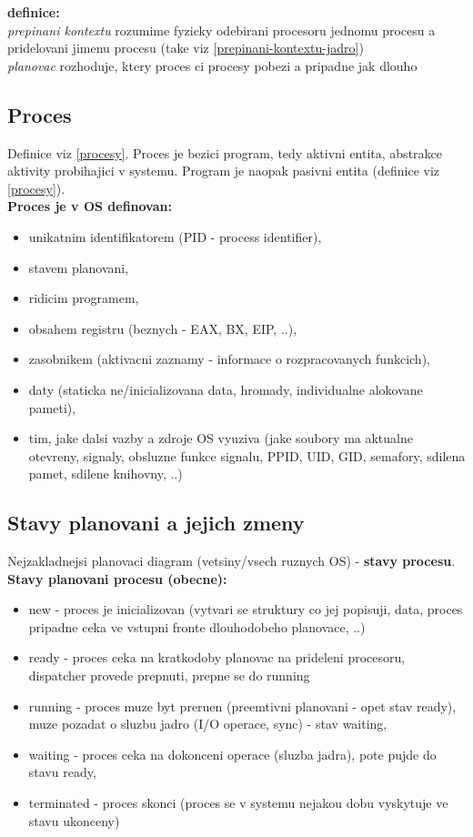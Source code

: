 \documentclass[a4paper, 11pt]{article}
\begin{document}
\textbf{definice:} \\[0.5em]
\textit{prepinani kontextu} rozumime fyzicky odebirani procesoru jednomu procesu a pridelovani jimenu procesu (take viz \ref{prepinani-kontextu-jadro}) \\[0.2em]
\textit{planovac} rozhoduje, ktery proces ci procesy pobezi a pripadne jak dlouho

\subsection{Proces}
Definice viz \ref{procesy}. Proces je bezici program, tedy aktivni entita, abstrakce aktivity probihajici v systemu. Program je naopak pasivni entita (definice viz \ref{procesy}). \\

\textbf{Proces je v OS definovan:}
\begin{itemize}
    \item unikatnim identifikatorem (PID - process identifier),
    \item stavem planovani,
    \item ridicim programem,
    \item obsahem registru (beznych - EAX, BX, EIP, ..),
    \item zasobnikem (aktivacni zaznamy - informace o rozpracovanych funkcich),
    \item daty (staticka ne/inicializovana data, hromady, individualne alokovane pameti),
    \item tim, jake dalsi vazby a zdroje OS vyuziva (jake soubory ma aktualne otevreny, signaly, obsluzne funkce signalu, PPID, UID, GID, semafory, sdilena pamet, sdilene knihovny, ..) \\
\end{itemize}

\newpage

\subsection{Stavy planovani a jejich zmeny}
Nejzakladnejsi planovaci diagram (vetsiny/vsech ruznych OS) - \textbf{stavy procesu}. \\

\textbf{Stavy planovani procesu (obecne):}
\begin{itemize}
    \item new - proces je inicializovan (vytvari se struktury co jej popisuji, data, proces pripadne ceka ve vstupni fronte dlouhodobeho planovace, ..)
    \item ready - proces ceka na kratkodoby planovac na prideleni procesoru, dispatcher provede prepnuti, prepne se do running
    \item running - proces muze byt preruen (preemtivni planovani - opet stav ready), muze pozadat o sluzbu jadro (I/O operace, sync) - stav waiting,
    \item waiting - proces ceka na dokonceni operace (sluzba jadra), pote pujde do stavu ready,
    \item terminated - proces skonci (proces se v systemu nejakou dobu vyskytuje ve stavu ukonceny) \\
\end{itemize}
\end{document}
